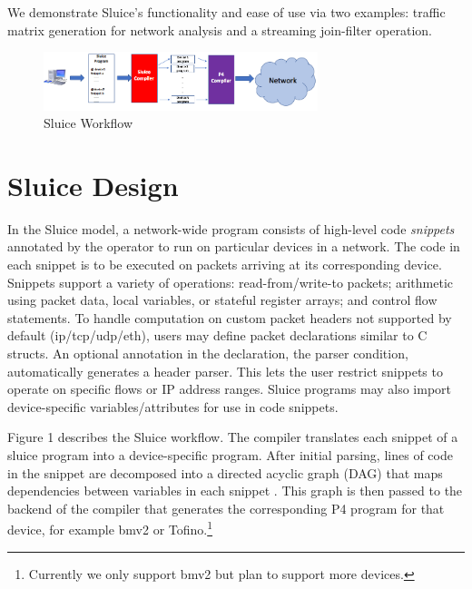 We demonstrate Sluice's functionality and ease of use
via two examples: traffic matrix generation for network analysis and a
streaming join-filter operation.
\begin{figure}[tp]
\centering
\includegraphics[width=80mm,scale=0.7]{figures/sluice_workflow.png}
\caption{Sluice Workflow}
\vspace{-8mm}
\end{figure}
\vspace{-4mm}

\section{Sluice Design}
In the Sluice model, a network-wide program consists of high-level code
\textit{snippets} annotated by the operator to run on particular devices in a
network. The code in each snippet is to be executed on packets arriving at its
corresponding device. Snippets support a variety of operations:
read-from/write-to packets; arithmetic using packet data, local variables, or
stateful register arrays; and control flow statements. To handle computation on
custom packet headers not supported by default (ip/tcp/udp/eth), users may
define packet declarations similar to C structs. An optional annotation in the
declaration, the parser condition, automatically generates a header parser.
This lets the user restrict snippets to operate on specific flows or IP address
ranges. Sluice programs may also import device-specific variables/attributes
for use in code snippets.

Figure 1 describes the Sluice workflow. The compiler translates each snippet of
a sluice program into a device-specific program. After initial parsing, lines of code in
the snippet are decomposed into a directed acyclic graph (DAG) that maps
dependencies between variables in each snippet . This
graph is then passed to the backend of the compiler that generates the
corresponding P4 program for that device, for example bmv2 or
Tofino.\footnote{Currently we only support bmv2 but plan to support more
devices.} 





